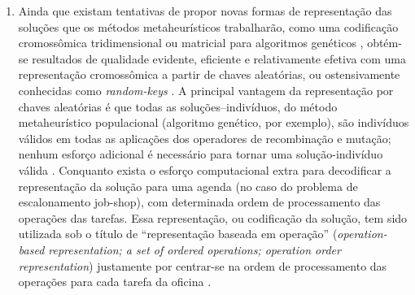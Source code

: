 \documentclass[relatorio,nocolorlinks]{inf-ufg}
\begin{document}
\begin{enumerate}

\item Ainda que existam tentativas de propor novas formas de representa\c{c}\~{a}o das solu\c{c}\~{o}es que os m\'{e}todos metaheur\'{i}sticos
trabalhar\~{a}o, como uma codifica\c{c}\~{a}o cromoss\^{o}mica tridimensional ou matricial para algoritmos gen\'{e}ticos \cite{Jinghua2010}
\cite{Yin2007} \cite{Zhang2010b}, obt\'{e}m-se resultados de qualidade evidente, eficiente e relativamente efetiva com uma representa\c{c}\~{a}o
cromoss\^{o}mica a partir de chaves aleat\'{o}rias, ou ostensivamente conhecidas como \textit{random-keys} \cite{Adibi2010} \cite{Goncalves2002}
\cite{Roshanaei2009} \cite{Lin2010}. A principal vantagem da representa\c{c}\~{a}o por chaves aleat\'{o}rias \'{e} que todas as
solu\c{c}\~{o}es--indiv\'{i}duos, do m\'{e}todo metaheur\'{i}stico populacional (algoritmo gen\'{e}tico, por exemplo), s\~{a}o indiv\'{i}duos
v\'{a}lidos em todas as aplica\c{c}\~{o}es dos operadores de recombina\c{c}\~{a}o e muta\c{c}\~{a}o; nenhum esfor\c{c}o adicional \'{e}
necess\'{a}rio para tornar uma solu\c{c}\~{a}o-indiv\'{i}duo v\'{a}lida \cite{Goncalves2002}. Conquanto exista o esfor\c{c}o computacional extra
para decodificar a representa\c{c}\~{a}o da solu\c{c}\~{a}o para uma agenda (no caso do problema de escalonamento job-shop), com determinada ordem
de processamento das opera\c{c}\~{o}es das tarefas. Essa representa\c{c}\~{a}o, ou codifica\c{c}\~{a}o da solu\c{c}\~{a}o, tem sido utilizada sob
o t\'{i}tulo de ``representa\c{c}\~{a}o baseada em opera\c{c}\~{a}o'' (\textit{operation-based representation; a set of ordered operations;
operation order representation}) justamente por centrar-se na ordem de processamento das opera\c{c}\~{o}es para cada tarefa da oficina
\cite{Roshanaei2009} \cite{Xiaomei2010} \cite{Zhang2009} \cite{Saidi2007} \cite{Rondon2009}.


\end{enumerate}
\end{document}
